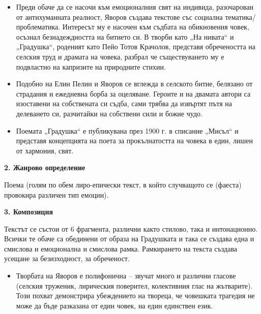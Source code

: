 \documentclass[12pt,a4paper]{article}
\begin{document}
\vspace{0.1cm}
\begin{itemize}[leftmargin=*, noitemsep, topsep=2pt, parsep=0pt]
    \item Преди обаче да се насочи към емоционалния свят на индивида, разочарован от антихуманната реалност, Яворов създава текстове със социална тематика/проблематика. Интересът му е насочен към съдбата на обикновения човек, осъзнал безнадеждността на битието си. В творби като „На нивата“ и „Градушка“, роденият като Пейо Тотов Крачолов, представя обречеността на селския труд и драмата на човека, разбрал че съществуването му е подвластно на капризите на природните стихии.
    \vspace{0.1cm}
    \item Подобно на Елин Пелин и Яворов се вглежда в селското битие, белязано от страдания и ежедневна борба за оцеляване. Героите и на двамата автори са изоставени на собствената си съдба, сами трябва да извъртят пътя на делеването си, разчитайки на собствени сили и божие чудо.
    \vspace{0.1cm}
    \item Поемата „Градушка“ е публикувана през 1900 г. в списание „Мисъл“ и представя концепцията на поета за прокълнатостта на човека в един, лишен от хармония, свят.
\end{itemize}

\vspace{0.1cm}
\textbf{2. Жанрово определение}
\vspace{0.1cm}

\indent Поема (голям по обем лиро-епически текст, в който случващото се (фаеста) провокира различен тип емоции).

\vspace{0.1cm}
\textbf{3. Композиция}
\vspace{0.1cm}

\indent Текстът се състои от 6 фрагмента, различни както стилово, така и интонационно. Всички те обаче са обединени от образа на Градушката и така се създава една и смислова и емоционална и смислова рамка. Рамкирането на текста създава усещане за безизходност, за обреченост.
 
\vspace{0.1cm}
\begin{itemize}[leftmargin=*, noitemsep, topsep=2pt, parsep=0pt]
    \item Творбата на Яворов е полифонична – звучат много и различни гласове (селския труженик, лирическия поверител, колективния глас на жътварите). Този похват демонстрира убеждението на твореца, че човешката трагедия не може да бъде разказана от един човек, на един единствен език.
\end{itemize}
\end{document}
